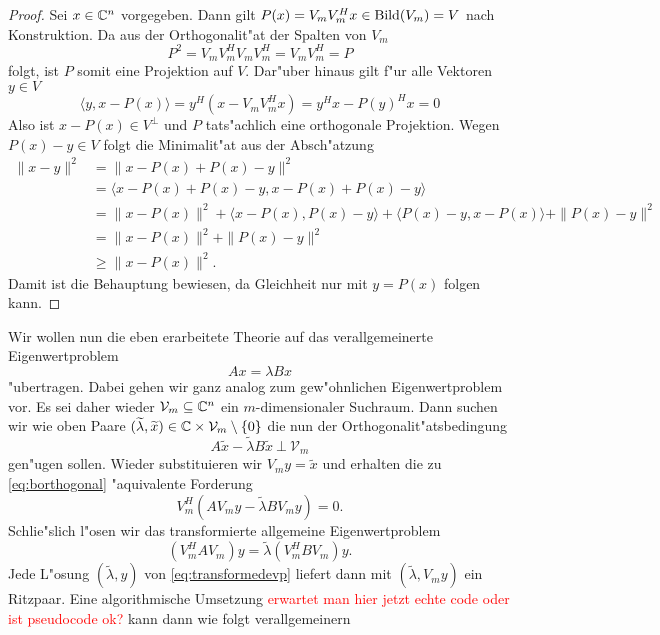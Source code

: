 \begin{proof}
Sei $x\in\mathbb{C}^n$ vorgegeben. Dann gilt $P(x) = V_m V_m^H x \in \operatorname{Bild}(V_m) = V$ nach Konstruktion.
Da aus der Orthogonalit"at der Spalten von $V_m$
\[
P^2 = V_m V_m^H V_m V_m^H = V_m V_m^H = P
\]
folgt, ist $P$ somit eine Projektion auf $V$. Dar"uber hinaus gilt f"ur alle
Vektoren $y\in V$
\[
\langle y, x-P(x)\rangle = y^H (x - V_m V_m^H x) = y^H x - P(y)^H x = 0
\]
Also ist $x-P(x) \in V^{\bot}$ und $P$ tats"achlich eine orthogonale Projektion.
Wegen $P(x)-y \in V$ folgt die Minimalit"at aus der Absch"atzung
\begin{align*}
\|x-y\|^2 &= \|x-P(x) + P(x)-y\|^2 \\
&= \langle x-P(x) + P(x)-y, x-P(x) + P(x)-y \rangle \\
&= \|x-P(x)\|^2 + \langle x-P(x), P(x)-y \rangle + \langle P(x)-y, x-P(x)\rangle + \|P(x)-y\|^2 \\
&= \|x - P(x)\|^2 + \| P(x)-y \|^2\\
&\ge \|x-P(x)\|^2.
\end{align*}
Damit ist die Behauptung bewiesen, da Gleichheit nur mit $y=P(x)$ folgen kann.
\end{proof}

Wir wollen nun die eben erarbeitete Theorie auf das verallgemeinerte Eigenwertproblem
\[
Ax = \lambda Bx
\]
"ubertragen. Dabei gehen wir ganz analog zum gew"ohnlichen Eigenwertproblem vor.
Es sei daher wieder $\mathcal{V}_m\subseteq \mathbb{C}^n$ ein $m$-dimensionaler Suchraum.
Dann suchen wir wie oben Paare $ (\widetilde{\lambda}, \widetilde{x}) \in \mathbb{C}
\times \mathcal{V}_m \setminus\{ 0\}$ die nun der Orthogonalit"atsbedingung
\begin{equation}\label{eq:borthogonal}
A\widetilde{x} - \widetilde{\lambda}B\widetilde{x} \ \bot \ \mathcal{V}_m
\end{equation}
gen"ugen sollen. Wieder substituieren wir $V_m y=\widetilde{x}$ und erhalten die
zu \eqref{eq:borthogonal} "aquivalente Forderung
\[
V_m^H(AV_m y - \widetilde{\lambda} BV_m y) = 0.
\]
Schlie"slich l"osen wir das transformierte allgemeine Eigenwertproblem
\begin{equation}\label{eq:transformedevp}
(V_m^H AV_m) y = \widetilde{\lambda} (V_m^H B V_m) y.
\end{equation}
Jede L"osung $(\widetilde{\lambda}, y)$ von \eqref{eq:transformedevp} liefert
dann mit $(\widetilde{\lambda}, V_m y)$ ein Ritzpaar. Eine algorithmische Umsetzung
\textcolor{red}{erwartet man hier jetzt echte code oder ist pseudocode ok?}
kann dann wie folgt verallgemeinern

